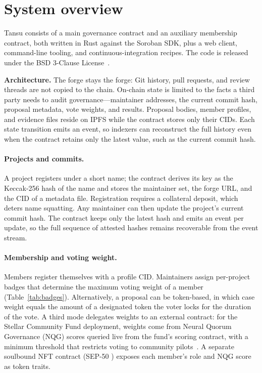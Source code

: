 \documentclass[11pt]{article}
\newcommand{\tansu}{Tansu}
\begin{document}
\section{System overview}
\label{sec:overview}

\tansu{} consists of a main governance contract and an auxiliary membership
contract, both written in Rust against the Soroban SDK, plus a web client,
command-line tooling, and continuous-integration recipes. The code is
released under the BSD 3-Clause License~\citep{tansu_repo}.

\noindent\textbf{Architecture.}
The forge stays the forge: Git history, pull requests, and review threads are
not copied to the chain. On-chain state is limited
to the facts a third party needs to audit governance---maintainer addresses,
the current commit hash, proposal metadata, vote weights, and results.
Proposal bodies, member profiles, and evidence files reside on IPFS while the
contract stores only their CIDs. Each state transition emits an event, so
indexers can reconstruct the full history even when the contract retains only
the latest value, such as the current commit hash.

\paragraph{Projects and commits.}
A project registers under a short name; the contract derives its key as the
Keccak-256 hash of the name and stores the maintainer set, the forge URL, and
the CID of a metadata file. Registration requires a collateral deposit, which
deters name squatting. Any maintainer can then update the project's current
commit hash. The contract keeps only the latest hash and emits an event per
update, so the full sequence of attested hashes remains recoverable from the
event stream.

\paragraph{Membership and voting weight.}
Members register themselves with a profile CID. Maintainers assign
per-project badges that determine the maximum voting weight of a member
(Table~\ref{tab:badges}). Alternatively, a proposal can be token-based, in
which case weight equals the amount of a designated token the voter locks
for the duration of the vote. A third mode delegates weights to an external
contract: for the Stellar Community Fund deployment, weights come from Neural
Quorum Governance (NQG) scores queried live from the fund's scoring contract,
with a minimum threshold that restricts voting to community
pilots~\citep{pg_award_proposer}. A separate soulbound NFT contract (SEP-50
\citep{sep50}) exposes each member's role and NQG score as token traits.
\end{document}
